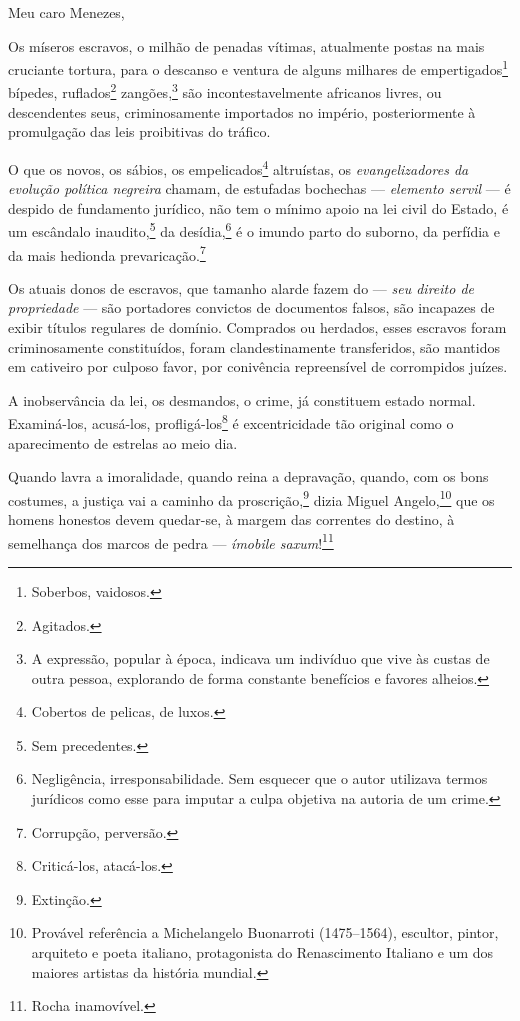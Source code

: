 Meu caro Menezes,

Os míseros escravos, o milhão de penadas vítimas, atualmente postas na
mais cruciante tortura, para o descanso e ventura de alguns milhares de
empertigados\footnote{Soberbos, vaidosos.} bípedes, ruflados\footnote{
  Agitados.} zangões,\footnote{A expressão, popular à época, indicava
  um indivíduo que vive às custas de outra pessoa, explorando de forma
  constante benefícios e favores alheios.} são incontestavelmente
africanos livres, ou descendentes seus, criminosamente importados no
império, posteriormente à promulgação das leis proibitivas do tráfico.

O que os novos, os sábios, os empelicados\footnote{Cobertos de
  pelicas, de luxos.} altruístas, os \emph{evangelizadores da evolução
política negreira} chamam, de estufadas bochechas --- \emph{elemento %
servil} --- é despido de fundamento jurídico, não tem o mínimo apoio na
lei civil do Estado, é um escândalo inaudito,\footnote{Sem precedentes.}
da desídia,\footnote{Negligência, irresponsabilidade. Sem esquecer que
  o autor utilizava termos jurídicos como esse para imputar a culpa
  objetiva na autoria de um crime.} é o imundo parto do suborno, da
perfídia e da mais hedionda prevaricação.\footnote{Corrupção,
  perversão.}

Os atuais donos de escravos, que tamanho alarde fazem do --- \emph{seu %
direito de propriedade} --- são portadores convictos de documentos
falsos, são incapazes de exibir títulos regulares de domínio. Comprados
ou herdados, esses escravos foram criminosamente constituídos, foram
clandestinamente transferidos, são mantidos em cativeiro por culposo
favor, por conivência repreensível de corrompidos juízes.

A inobservância da lei, os desmandos, o crime, já constituem estado
normal. Examiná-los, acusá-los, profligá-los\footnote{Criticá-los,
  atacá-los.} é excentricidade tão original como o aparecimento de
estrelas ao meio dia.

Quando lavra a imoralidade, quando reina a depravação, quando, com os
bons costumes, a justiça vai a caminho da proscrição,\footnote{Extinção.}
dizia Miguel Angelo,\footnote{Provável referência a Michelangelo
  Buonarroti (1475--1564), escultor, pintor, arquiteto e poeta italiano,
  protagonista do Renascimento Italiano e um dos maiores artistas da
  história mundial.} que os homens honestos devem quedar-se, à margem
das correntes do destino, à semelhança dos marcos de pedra ---
\emph{ímobile saxum}!\footnote{Rocha inamovível.}

